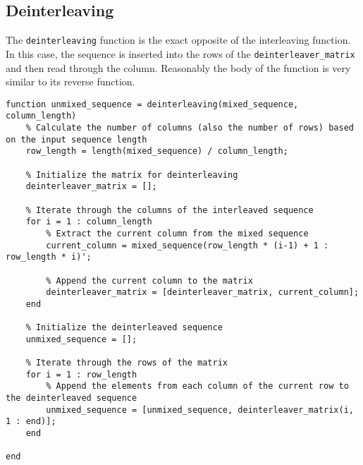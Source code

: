 \subsection{Deinterleaving}\label{deinterleaving}
The \texttt{deinterleaving} function is the exact opposite of the interleaving function. In this case, the sequence is inserted into the rows of the \texttt{deinterleaver\_matrix} and then read through the column. Reasonably the body of the function is very similar to its reverse function.

\begin{lstlisting}
function unmixed_sequence = deinterleaving(mixed_sequence, column_length)
    % Calculate the number of columns (also the number of rows) based on the input sequence length
    row_length = length(mixed_sequence) / column_length;

    % Initialize the matrix for deinterleaving
    deinterleaver_matrix = [];

    % Iterate through the columns of the interleaved sequence
    for i = 1 : column_length
        % Extract the current column from the mixed sequence
        current_column = mixed_sequence(row_length * (i-1) + 1 : row_length * i)';
        
        % Append the current column to the matrix
        deinterleaver_matrix = [deinterleaver_matrix, current_column];
    end
    
    % Initialize the deinterleaved sequence
    unmixed_sequence = [];

    % Iterate through the rows of the matrix
    for i = 1 : row_length
        % Append the elements from each column of the current row to the deinterleaved sequence
        unmixed_sequence = [unmixed_sequence, deinterleaver_matrix(i, 1 : end)];
    end

end
\end{lstlisting}



